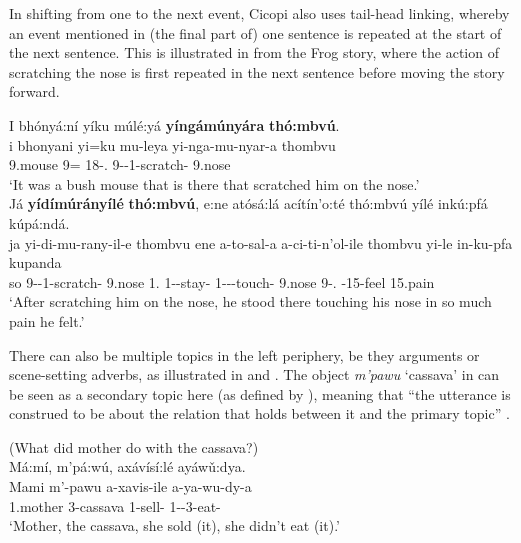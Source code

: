 \documentclass[output=paper]{langscibook}
\begin{document}
\z

In shifting from one to the next event, Cicopi also uses tail-head linking, whereby an event mentioned in (the final part of) one sentence is repeated at the start of the next sentence. This is illustrated in  from the Frog story, where the action of scratching the nose is first repeated in the next sentence before moving the story forward.

\ea
\label{bkm:Ref121989204}
I bhónyá:ní yíku múlé:yá \textbf{yíngámúnyára} \textbf{thó:mbvú}.\\
\gll
i  bhonyani  yi=ku  mu-leya  yi-nga-mu-nyar-a  thombvu\\
\COP{}  9.mouse  9\SM{}=\REL{}  18-\DEM.\DIST{}  9\SM{}-\REL{}-1\OM{}-scratch-\FV{}  9.nose\\
\glt
‘It was a bush mouse that is there that scratched him on the nose.’\\

\sn
Já \textbf{yídímúrányílé} \textbf{thó:mbvú}, e:ne atósá:lá acítín’o:té thó:mbvú yílé inkú:pfá kúpá:ndá. \\
\gll
ja  yi-di-mu-rany-il-e  thombvu  ene  a-to-sal-a  a-ci-ti-n’ol-ile  thombvu  yi-le  in-ku-pfa  kupanda  \\
so  9\SM{}-\DEP{}-1\OM{}-scratch-\PFV{}  9.nose  1.\PRO{}  1\SM{}-\TO{}-stay-\FV{}  1\SM{}-\CON{}-\IPFV{}-touch-\PFV{}  9.nose  9-\DEM.\MED{}  \LINK{}-15-feel   15.pain\\
\glt
‘After scratching him on the nose, he stood there touching his nose in so much pain he felt.’

\z

There can also be multiple topics in the left periphery, be they arguments or scene-setting adverbs, as illustrated in  and . The object \textit{m’pawu} ‘cassava’ in  can be seen as a secondary topic here (as defined by \citealt{DalrympleNikolaeva2011}), meaning that “the utterance is construed to be about the relation that holds between it and the primary topic” \citep[2]{Nikolaeva2001}.

\ea
\label{bkm:Ref122335950}
(What did mother do with the cassava?)\\
Má:mí, m’pá:wú, axávísí:lé ayáwǔ:dya.\\
\gll
Mami  m’-pawu  a-xavis-ile  a-ya-wu-dy-a\\
1.mother  3-cassava  1\SM{}-sell-\PFV{}  1\SM{}-\NEG{}-3\OM{}-eat-\FV{}\\
\glt
‘Mother, the cassava, she sold (it), she didn’t eat (it).’\\
\end{document}
